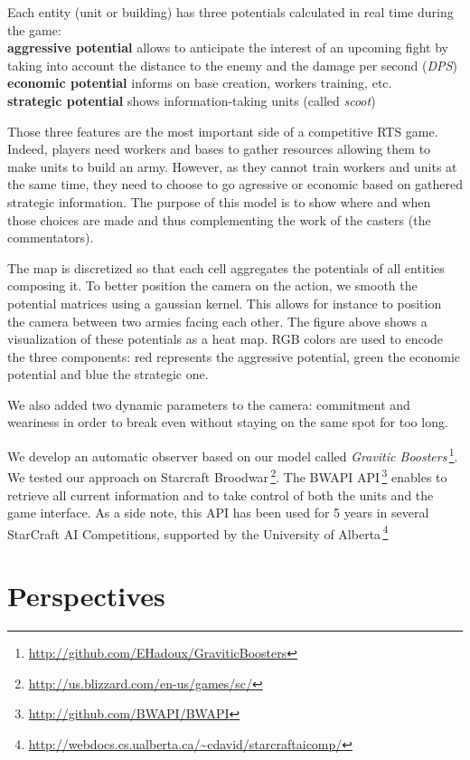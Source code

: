 \documentclass{jfsma}
\begin{document}
Each entity (unit or building) has three potentials calculated in real time during the game:\\
\textbf{aggressive potential} allows to anticipate the interest of an upcoming fight by taking into account the distance to the enemy and the damage per second (\emph{DPS})\\
\textbf{economic potential} informs on base creation, workers training, etc.\\
\textbf{strategic potential} shows information-taking units (called \emph{scoot}) 

Those three features are the most important side of a competitive RTS game.
Indeed, players need workers and bases to gather resources allowing them to make units to build an army.
However, as they cannot train workers and units at the same time, they need to choose to go agressive or economic based on gathered strategic information.
The purpose of this model is to show where and when those choices are made and thus complementing the work of the casters (the commentators).

The map is discretized so that each cell aggregates the potentials of all entities composing it. 
To better position the camera on the action, we smooth the potential matrices using a gaussian kernel. 
This allows for instance to position the camera between two armies facing each other. 
The figure above shows a visualization of these potentials as a heat map.
RGB colors are used to encode the three components: red represents the aggressive potential, green the economic potential and blue the strategic one.

We also added two dynamic parameters to the camera: commitment and weariness in order to break even without staying on the same spot for too long.

We develop an automatic observer based on our model called \emph{Gravitic Boosters}\,\footnote{\url{http://github.com/EHadoux/GraviticBoosters}}.
We tested our approach on Starcraft Broodwar\,\footnote{\url{http://us.blizzard.com/en-us/games/sc/}}. 
The BWAPI API\,\footnote{\url{http://github.com/BWAPI/BWAPI}} enables to retrieve all current information and to take control of both the units and the game interface.
As a side note, this API has been used for 5 years in several StarCraft AI Competitions, supported by the University of Alberta\,\footnote{\url{http://webdocs.cs.ualberta.ca/~cdavid/starcraftaicomp/}}  

\section{Perspectives}
\end{document}
